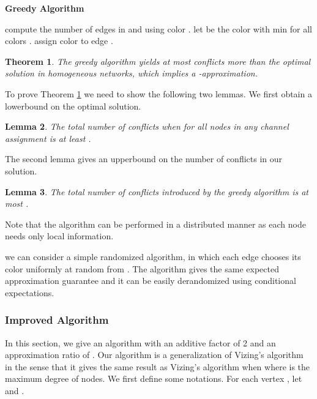 \documentclass[titlepage, 11pt]{article}
\newtheorem{theorem}{Theorem}
\newtheorem{lemma}[theorem]{Lemma}
\begin{document}
\begin{algorithm}[h]
\caption{\bf  Greedy Algorithm}
\label{dgreedy}
\begin{algorithmic}
	\STATE compute the number of edges in  and  using color .
	\ENDFOR
	\STATE let  be the color with min  for all colors .
	\STATE assign color  to edge .

\ENDFOR
\end{algorithmic}
\end{algorithm}

\begin{theorem}
\label{th:onehop-greedy}
The greedy algorithm yields at most   conflicts more than the optimal solution
in homogeneous networks, which implies  a  -approximation.
\end{theorem}
To prove Theorem \ref{th:onehop-greedy} we need to show the following two lemmas. We first obtain a lowerbound on the optimal solution.

\begin{lemma}
The total number of conflicts when  for all nodes  in any channel assignment
is at least
.
\label{lemma:lower}
\end{lemma}

The second lemma gives an upperbound on the number of conflicts in our solution.
\begin{lemma}
The total number of conflicts introduced by the greedy algorithm is at most 
.
\label{lemma:upper}
\end{lemma}
Note that the algorithm can be performed in a distributed manner as each node needs only local information. 

 we can consider a simple randomized algorithm, in which each edge
chooses its color uniformly at random from . 
The algorithm gives the same expected approximation guarantee and
it can be easily derandomized using conditional expectations.  \\



\subsubsection{Improved Algorithm}
\label{sec:improv}
In this section, we give an algorithm with an additive factor of 2 and an approximation ratio of  . Our algorithm is a generalization of Vizing's algorithm in the sense that
it gives the same result as Vizing's algorithm  when  where  is the maximum degree of nodes. 
We first define some notations. For each vertex , let  and .
\end{document}
